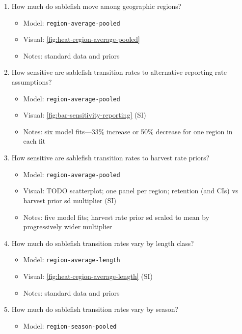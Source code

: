\documentclass{article}
\begin{document}
\begin{enumerate}
    \item How much do sablefish move among geographic regions? 
        \begin{itemize}
            \item Model: \texttt{region-average-pooled}
            \item Visual: \autoref{fig:heat-region-average-pooled}
            \item Notes: standard data and priors
        \end{itemize}
    \item How sensitive are sablefish transition rates to alternative reporting rate assumptions?
        \begin{itemize}
            \item Model: \texttt{region-average-pooled}
            \item Visual: \autoref{fig:bar-sensitivity-reporting} (SI)
            \item Notes: six model fits---33\% increase or 50\% decrease for one region in each fit
        \end{itemize}
    \item How sensitive are sablefish transition rates to harvest rate priors?
        \begin{itemize}
            \item Model: \texttt{region-average-pooled}
            \item Visual: TODO scatterplot; one panel per region; retention (and CIs) vs harvest prior sd multiplier (SI)
            \item Notes: five model fits; harvest rate prior sd scaled to mean by progressively wider multiplier
        \end{itemize}    
    \item How much do sablefish transition rates vary by length class?
        \begin{itemize}
            \item Model: \texttt{region-average-length}
            \item Visual: \autoref{fig:heat-region-average-length} (SI)
            \item Notes: standard data and priors
        \end{itemize}    
    \item How much do sablefish transition rates vary by season?
        \begin{itemize}
            \item Model: \texttt{region-season-pooled}

\end{itemize}
\end{enumerate}
\end{document}
